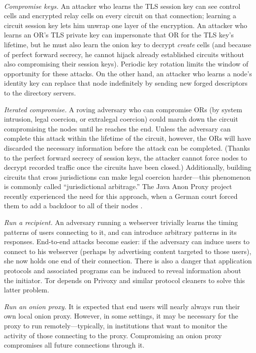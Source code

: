\documentclass[times,10pt,twocolumn]{article}
\begin{document}
\\
\emph{Compromise keys.} An attacker who learns the TLS session key can
see control cells and encrypted relay cells on every circuit on that
connection; learning a circuit
session key lets him unwrap one layer of the encryption. An attacker
who learns an OR's TLS private key can impersonate that OR for the TLS
key's lifetime, but he must
also learn the onion key to decrypt \emph{create} cells (and because of
perfect forward secrecy, he cannot hijack already established circuits
without also compromising their session keys). Periodic key rotation
limits the window of opportunity for these attacks. On the other hand,
an attacker who learns a node's identity key can replace that node
indefinitely by sending new forged descriptors to the directory servers.

\emph{Iterated compromise.} A roving adversary who can
compromise ORs (by system intrusion, legal coercion, or extralegal
coercion) could march down the circuit compromising the
nodes until he reaches the end.  Unless the adversary can complete
this attack within the lifetime of the circuit, however, the ORs
will have discarded the necessary information before the attack can
be completed.  (Thanks to the perfect forward secrecy of session
keys, the attacker cannot force nodes to decrypt recorded
traffic once the circuits have been closed.)  Additionally, building
circuits that cross jurisdictions can make legal coercion
harder---this phenomenon is commonly called ``jurisdictional
arbitrage.'' The Java Anon Proxy project recently experienced the
need for this approach, when
a German court forced them to add a backdoor to
all of their nodes \cite{jap-backdoor}.

\emph{Run a recipient.} An adversary running a webserver
trivially learns the timing patterns of users connecting to it, and
can introduce arbitrary patterns in its responses.
End-to-end attacks become easier: if the adversary can induce
users to connect to his webserver (perhaps by advertising
content targeted to those users), she now holds one end of their
connection.  There is also a danger that application
protocols and associated programs can be induced to reveal information
about the initiator. Tor depends on Privoxy and similar protocol cleaners
to solve this latter problem.

\emph{Run an onion proxy.} It is expected that end users will
nearly always run their own local onion proxy. However, in some
settings, it may be necessary for the proxy to run
remotely---typically, in institutions that want
to monitor the activity of those connecting to the proxy.
Compromising an onion proxy compromises all future connections
through it.
\end{document}
